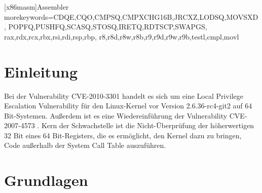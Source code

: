 \documentclass[11pt,a4paper]{article}
\begin{document}
   [x86masm]{Assembler} %
   {morekeywords={CDQE,CQO,CMPSQ,CMPXCHG16B,JRCXZ,LODSQ,MOVSXD, %
                  POPFQ,PUSHFQ,SCASQ,STOSQ,IRETQ,RDTSCP,SWAPGS, %
                  rax,rdx,rcx,rbx,rsi,rdi,rsp,rbp, %
                  r8,r8d,r8w,r8b,r9,r9d,r9w,r9b,testl,cmpl,movl}} %

\lstset{language=[x64]Assembler}


\clearpage
\setcounter{page}{1}
\tableofcontents

\section{Einleitung}
\setcounter{page}{1}
Bei der Vulnerability CVE-2010-3301 handelt es sich um eine Local Privilege Escalation Vulnerability für den Linux-Kernel vor Version 2.6.36-rc4-git2 auf 64 Bit-Systemen. Außerdem ist es eine Wiedereinführung der Vulnerability CVE-2007-4573 \cite{CVE0}. Kern der Schwachstelle ist die Nicht-Überprüfung der höherwertigen 32 Bit eines 64 Bit-Registers, die es ermöglicht, den Kernel dazu zu bringen, Code außerhalb der System Call Table auszuführen.
\section{Grundlagen}
\end{document}
